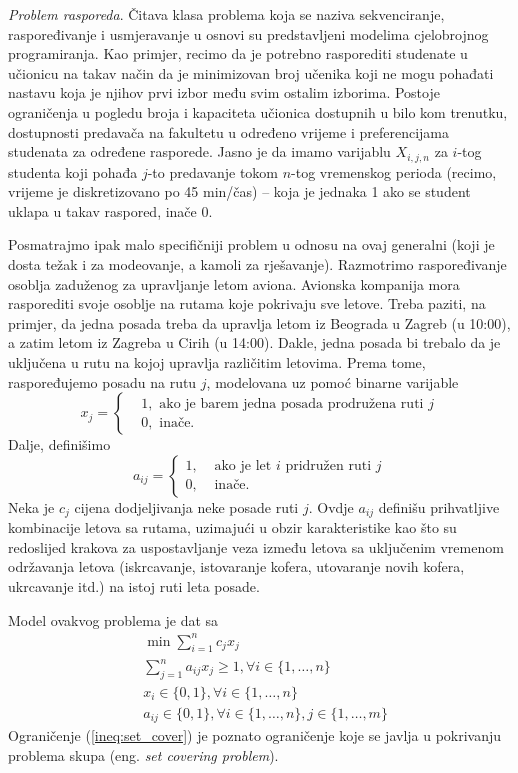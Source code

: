 \documentclass[a4paper, utf8, 11pt, colorlinks]{book}
\begin{document}
\emph{Problem rasporeda}. Čitava klasa problema koja se naziva sekvenciranje, raspoređivanje i usmjeravanje u osnovi su predstavljeni modelima cjelobrojnog programiranja. Kao primjer, recimo da je potrebno rasporediti studenate u  učionicu na takav način
da je minimizovan broj učenika koji ne mogu pohađati nastavu koja je njihov prvi izbor među svim ostalim izborima. Postoje ograničenja u pogledu broja i kapaciteta učionica dostupnih u bilo kom trenutku, dostupnosti predavača na fakultetu u određeno vrijeme i preferencijama studenata za određene rasporede. Jasno je da imamo varijablu $X_{i,j,n}$ za   $i$-tog studenta 
koji pohađa $j$-to predavanje tokom $n$-tog vremenskog perioda (recimo, vrijeme je diskretizovano po 45 min/čas) -- koja je jednaka 1 ako se student uklapa u takav raspored, inače 0. 

Posmatrajmo ipak malo specifičniji problem u odnosu na ovaj generalni (koji je dosta težak i za modeovanje, a kamoli za rješavanje). 
Razmotrimo raspoređivanje osoblja zaduženog za upravljanje letom aviona. 
Avionska kompanija mora rasporediti svoje osoblje na rutama koje pokrivaju sve letove. Treba paziti, na primjer, da jedna posada treba da upravlja letom iz  Beograda u Zagreb (u 10:00), a zatim letom iz Zagreba u Cirih (u 14:00). Dakle, jedna posada bi trebalo da je uključena u rutu na kojoj upravlja različitim letovima. Prema tome, raspoređujemo posadu na rutu $j$, modelovana uz pomoć binarne varijable 
$$x_j = \begin{cases}
    &1, \mbox{ ako je barem jedna posada prodružena ruti } j \\
    &0, \mbox{ inače}. 
\end{cases}
$$
Dalje, definišimo 
$$a_{ij}= \begin{cases}
             1,& \mbox{ ako je let } i \mbox{ pridružen ruti } j \\
             0,& \mbox{ inače}.
        \end{cases}
$$
Neka je $c_j$ cijena dodjeljivanja neke posade ruti $j$. Ovdje $a_{ij}$ definišu prihvatljive kombinacije letova sa rutama, uzimajući u obzir  karakteristike kao što su redoslijed krakova za uspostavljanje veza između letova sa uključenim vremenom  održavanja letova (iskrcavanje, istovaranje kofera, utovaranje novih kofera, ukrcavanje itd.) na istoj ruti leta posade.   

Model ovakvog problema je dat sa 
\begin{align}
    &\min \sum_{i=1}^n c_j x_j \nonumber\\
    & \sum_{j=1}^n a_{ij} x_j \geq 1, \forall i \in \{1,\ldots, n\} \label{ineq:set_cover} \\
    & x_i \in \{0, 1 \}, \forall i \in \{1, \ldots, n\} \\
    & a_{ij} \in \{0, 1\}, \forall i \in \{1, \ldots, n\}, j \in\{1,\ldots, m\} \nonumber
\end{align}
Ograničenje (\ref{ineq:set_cover}) je poznato ograničenje koje se javlja u pokrivanju problema skupa (eng. \emph{set covering problem}).
\end{document}
